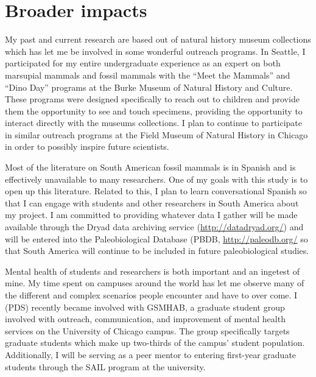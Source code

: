 \documentclass[11pt,letterpaper]{article}
\begin{document}
\section{Broader impacts}

My past and current research are based out of natural history museum collections which has let me be involved in some wonderful outreach programs. In Seattle, I participated for my entire undergraduate experience as an expert on both marsupial mammals and fossil mammals with the ``Meet the Mammals'' and ``Dino Day'' programs at the Burke Museum of Natural History and Culture. These programs were designed specifically to reach out to children and provide them the opportunity to see and touch specimens, providing the opportunity to interact directly with the museums collections. I plan to continue to participate in similar outreach programs at the Field Museum of Natural History in Chicago in order to possibly inspire future scientists. %

Most of the literature on South American fossil mammals is in Spanish and is effectively unavailable to many researchers. One of my goals with this study is to open up this literature. Related to this, I plan to learn conversational Spanish so that I can engage with students and other researchers in South America about my project. I am committed to providing whatever data I gather will be made available through the Dryad data archiving service (\url{http://datadryad.org/}) and will be entered into the Paleobiological Database (PBDB, \url{http://paleodb.org/} so that South America will continue to be included in future paleobiological studies. 

Mental health of students and researchers is both important and an ingetest of mine. My time spent on campuses around the world has let me observe many of the different and complex scenarios people encounter and have to over come. I (PDS) recently became involved with GSMHAB, a graduate student group involved with outreach, communication, and improvement of mental health services on the University of Chicago campus. The group specifically targets graduate students which make up two-thirds of the campus' student population. Additionally, I will be serving as a peer mentor to entering first-year graduate students through the SAIL program at the university.




\end{document}
